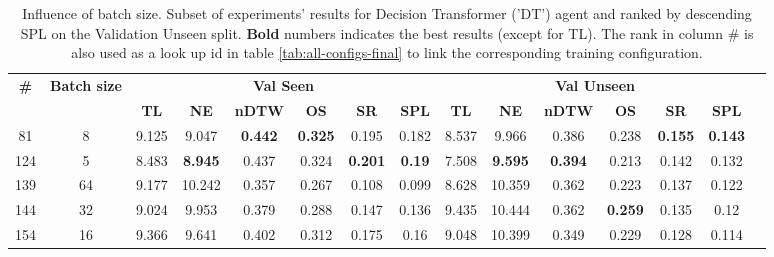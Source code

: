 \begin{table}
\centering
\caption{\label{tab:dt_batch_test}Influence of batch size. Subset of experiments' results for Decision Transformer ('DT') agent and ranked by descending SPL on the Validation Unseen split. \textbf{Bold} numbers indicates the best results (except for TL). The rank in column \# is also used as a look up id in table \ref{tab:all-configs-final} to link the corresponding training configuration.}
\begin{tabular}{@{\hskip3pt}c@{\hskip3pt}c@{\hskip3pt}c@{\hskip3pt}c@{\hskip3pt}c@{\hskip3pt}c@{\hskip3pt}c@{\hskip3pt}c@{\hskip3pt}c@{\hskip3pt}c@{\hskip3pt}c@{\hskip3pt}c@{\hskip3pt}c@{\hskip3pt}c@{\hskip3pt}c}
\toprule
                                  \textbf{\#} & \textbf{Batch size} & \multicolumn{6}{c}{\textbf{Val Seen}} & \multicolumn{6}{c}{\textbf{Val Unseen}} \\
\cmidrule(l){3-8}\cmidrule(l){9-14}\textbf{~} &          \textbf{~} &       \textbf{TL} &     \textbf{NE} &   \textbf{nDTW} &     \textbf{OS} &     \textbf{SR} &   \textbf{SPL} &         \textbf{TL} &     \textbf{NE} &   \textbf{nDTW} &     \textbf{OS} &     \textbf{SR} &    \textbf{SPL} \\
\midrule
                                           81 &                   8 &             9.125 &           9.047 &  \textbf{0.442} &  \textbf{0.325} &           0.195 &          0.182 &               8.537 &           9.966 &           0.386 &           0.238 &  \textbf{0.155} &  \textbf{0.143} \\
                                          124 &                   5 &             8.483 &  \textbf{8.945} &           0.437 &           0.324 &  \textbf{0.201} &  \textbf{0.19} &               7.508 &  \textbf{9.595} &  \textbf{0.394} &           0.213 &           0.142 &           0.132 \\
                                          139 &                  64 &             9.177 &          10.242 &           0.357 &           0.267 &           0.108 &          0.099 &               8.628 &          10.359 &           0.362 &           0.223 &           0.137 &           0.122 \\
                                          144 &                  32 &             9.024 &           9.953 &           0.379 &           0.288 &           0.147 &          0.136 &               9.435 &          10.444 &           0.362 &  \textbf{0.259} &           0.135 &            0.12 \\
                                          154 &                  16 &             9.366 &           9.641 &           0.402 &           0.312 &           0.175 &           0.16 &               9.048 &          10.399 &           0.349 &           0.229 &           0.128 &           0.114 \\
\bottomrule
\end{tabular}
\end{table}
